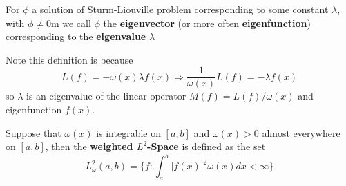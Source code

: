 \begin{defn}
For $\phi$ a solution of Sturm-Liouville problem
corresponding to some constant $\lambda$, with
$\phi\neq0$m we call $\phi$ the \textbf{eigenvector} (or
more often \textbf{eigenfunction}) corresponding to the
\textbf{eigenvalue} $\lambda$
\end{defn}
Note this definition is because
\begin{equation*}
L(f)=-\omega(x)\lambda
f(x)\Rightarrow\frac{1}{\omega(x)}L(f)=-\lambda f(x)
\end{equation*}
so $\lambda$ is an eigenvalue of the linear operator
$M(f)=L(f)/\omega(x)$ and eigenfunction $f(x)$.
\begin{defn}
Suppose that $\omega(x)$ is integrable on $[a,b]$ and
$\omega(x)>0$ almost everywhere on $[a,b]$, then the
\textbf{weighted $L^{2}$-Space} is defined as the set
\begin{equation}
L^{2}_{\omega}(a,b) = \{ f: \int^{b}_{a}|f(x)|^2\omega(x)dx < \infty\}
\end{equation}
\end{defn}
